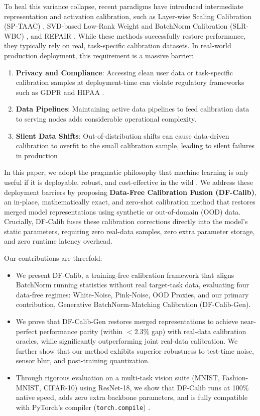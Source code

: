 \documentclass{article}
\theoremstyle{plain}
\theoremstyle{definition}
\theoremstyle{remark}
\begin{document}
To heal this variance collapse, recent paradigms have introduced intermediate representation and activation calibration, such as Layer-wise Scaling Calibration (SP-TAAC) \cite{sptaac2026}, SVD-based Low-Rank Weight and BatchNorm Calibration (SLR-WBC) \cite{slr_wbc2026}, and REPAIR \cite{Jordan2023}. While these methods successfully restore performance, they typically rely on real, task-specific calibration datasets. In real-world production deployment, this requirement is a massive barrier:
\begin{enumerate}
  \item \textbf{Privacy and Compliance}: Accessing clean user data or task-specific calibration samples at deployment-time can violate regulatory frameworks such as GDPR and HIPAA \cite{McMahan2017}.
  \item \textbf{Data Pipelines}: Maintaining active data pipelines to feed calibration data to serving nodes adds considerable operational complexity.
  \item \textbf{Silent Data Shifts}: Out-of-distribution shifts can cause data-driven calibration to overfit to the small calibration sample, leading to silent failures in production \cite{Hendrycks2019}.
\end{enumerate}

In this paper, we adopt the pragmatic philosophy that machine learning is only useful if it is deployable, robust, and cost-effective in the wild \cite{Liang2022, slr_wbc2026}. We address these deployment barriers by proposing \textbf{Data-Free Calibration Fusion (DF-Calib)}, an in-place, mathematically exact, and zero-shot calibration method that restores merged model representations using synthetic or out-of-domain (OOD) data. Crucially, DF-Calib fuses these calibration corrections directly into the model's static parameters, requiring zero real-data samples, zero extra parameter storage, and zero runtime latency overhead.

Our contributions are threefold:
\begin{itemize}
  \item We present DF-Calib, a training-free calibration framework that aligns BatchNorm running statistics without real target-task data, evaluating four data-free regimes: White-Noise, Pink-Noise, OOD Proxies, and our primary contribution, Generative BatchNorm-Matching Calibration (DF-Calib-Gen).
  \item We prove that DF-Calib-Gen restores merged representations to achieve near-perfect performance parity (within $<2.3\%$ gap) with real-data calibration oracles, while significantly outperforming joint real-data calibration. We further show that our method exhibits superior robustness to test-time noise, sensor blur, and post-training quantization.
  \item Through rigorous evaluation on a multi-task vision suite (MNIST, Fashion-MNIST, CIFAR-10) using ResNet-18, we show that DF-Calib runs at 100\% native speed, adds zero extra backbone parameters, and is fully compatible with PyTorch's compiler (\texttt{torch.compile}) \cite{Paszke2019, Ansel2024}.
\end{itemize}
\end{document}
